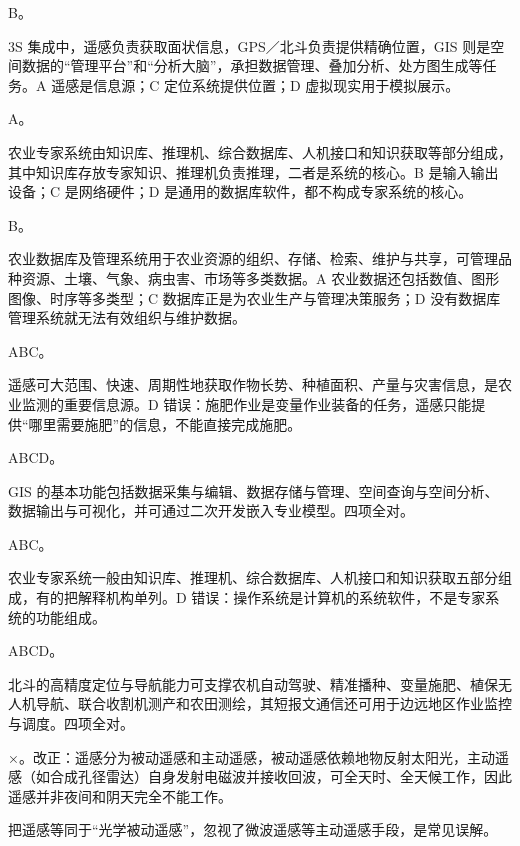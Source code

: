 \documentclass[a4paper,11pt]{article}
\begin{document}
\q B。\begin{analysis}3S 集成中，遥感负责获取面状信息，GPS／北斗负责提供精确位置，GIS 则是空间数据的“管理平台”和“分析大脑”，承担数据管理、叠加分析、处方图生成等任务。A 遥感是信息源；C 定位系统提供位置；D 虚拟现实用于模拟展示。\end{analysis}

\q A。\begin{analysis}农业专家系统由知识库、推理机、综合数据库、人机接口和知识获取等部分组成，其中知识库存放专家知识、推理机负责推理，二者是系统的核心。B 是输入输出设备；C 是网络硬件；D 是通用的数据库软件，都不构成专家系统的核心。\end{analysis}

\q B。\begin{analysis}农业数据库及管理系统用于农业资源的组织、存储、检索、维护与共享，可管理品种资源、土壤、气象、病虫害、市场等多类数据。A 农业数据还包括数值、图形图像、时序等多类型；C 数据库正是为农业生产与管理决策服务；D 没有数据库管理系统就无法有效组织与维护数据。\end{analysis}


\q ABC。\begin{analysis}遥感可大范围、快速、周期性地获取作物长势、种植面积、产量与灾害信息，是农业监测的重要信息源。D 错误：施肥作业是变量作业装备的任务，遥感只能提供“哪里需要施肥”的信息，不能直接完成施肥。\end{analysis}

\q ABCD。\begin{analysis}GIS 的基本功能包括数据采集与编辑、数据存储与管理、空间查询与空间分析、数据输出与可视化，并可通过二次开发嵌入专业模型。四项全对。\end{analysis}

\q ABC。\begin{analysis}农业专家系统一般由知识库、推理机、综合数据库、人机接口和知识获取五部分组成，有的把解释机构单列。D 错误：操作系统是计算机的系统软件，不是专家系统的功能组成。\end{analysis}

\q ABCD。\begin{analysis}北斗的高精度定位与导航能力可支撑农机自动驾驶、精准播种、变量施肥、植保无人机导航、联合收割机测产和农田测绘，其短报文通信还可用于边远地区作业监控与调度。四项全对。\end{analysis}


\q ×。改正：遥感分为被动遥感和主动遥感，被动遥感依赖地物反射太阳光，主动遥感（如合成孔径雷达）自身发射电磁波并接收回波，可全天时、全天候工作，因此遥感并非夜间和阴天完全不能工作。\begin{analysis}把遥感等同于“光学被动遥感”，忽视了微波遥感等主动遥感手段，是常见误解。\end{analysis}
\end{document}
